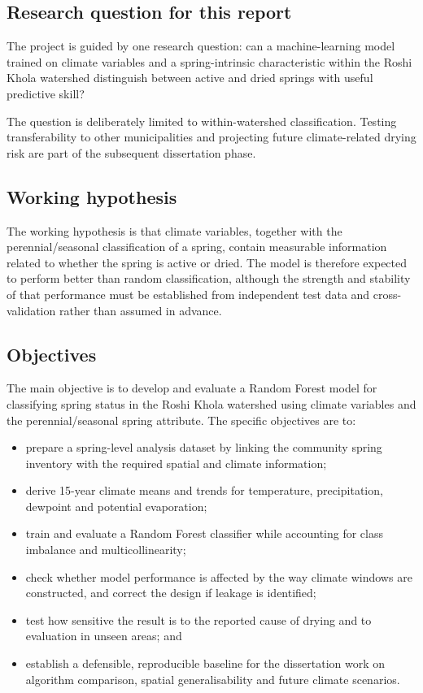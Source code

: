 \documentclass[12pt,a4paper]{article}
\begin{document}
\subsection{Research question for this report}

The project is guided by one research question: can a machine-learning model trained on climate variables and a spring-intrinsic characteristic within the Roshi Khola watershed distinguish between active and dried springs with useful predictive skill?

The question is deliberately limited to within-watershed classification. Testing transferability to other municipalities and projecting future climate-related drying risk are part of the subsequent dissertation phase.

\subsection{Working hypothesis}

The working hypothesis is that climate variables, together with the perennial/seasonal classification of a spring, contain measurable information related to whether the spring is active or dried. The model is therefore expected to perform better than random classification, although the strength and stability of that performance must be established from independent test data and cross-validation rather than assumed in advance.

\subsection{Objectives}

The main objective is to develop and evaluate a Random Forest model for classifying spring status in the Roshi Khola watershed using climate variables and the perennial/seasonal spring attribute. The specific objectives are to:

\begin{itemize}
  \item prepare a spring-level analysis dataset by linking the community spring inventory with the required spatial and climate information;
  \item derive 15-year climate means and trends for temperature, precipitation, dewpoint and potential evaporation;
  \item train and evaluate a Random Forest classifier while accounting for class imbalance and multicollinearity;
  \item check whether model performance is affected by the way climate windows are constructed, and correct the design if leakage is identified;
  \item test how sensitive the result is to the reported cause of drying and to evaluation in unseen areas; and
  \item establish a defensible, reproducible baseline for the dissertation work on algorithm comparison, spatial generalisability and future climate scenarios.
\end{itemize}
\end{document}
